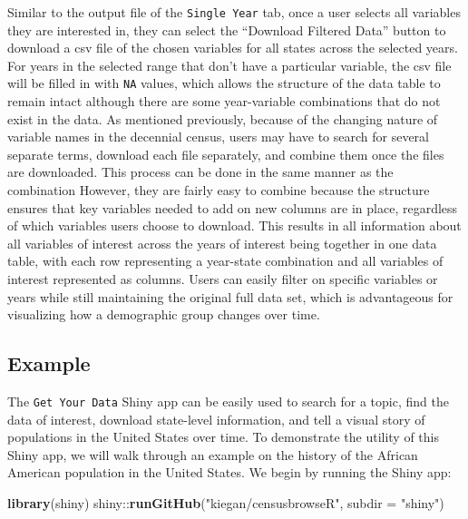 \documentclass[11pt,]{article}
\newenvironment{Shaded}{\begin{snugshade}}{\end{snugshade}}
\newcommand{\KeywordTok}[1]{\textcolor[rgb]{0.13,0.29,0.53}{\textbf{{#1}}}}
\newcommand{\DataTypeTok}[1]{\textcolor[rgb]{0.13,0.29,0.53}{{#1}}}
\newcommand{\StringTok}[1]{\textcolor[rgb]{0.31,0.60,0.02}{{#1}}}
\newcommand{\NormalTok}[1]{{#1}}
\begin{document}
Similar to the output file of the \texttt{Single\ Year} tab, once a user
selects all variables they are interested in, they can select the
``Download Filtered Data'' button to download a csv file of the chosen
variables for all states across the selected years. For years in the
selected range that don't have a particular variable, the csv file will
be filled in with \texttt{NA} values, which allows the structure of the
data table to remain intact although there are some year-variable
combinations that do not exist in the data. As mentioned previously,
because of the changing nature of variable names in the decennial
census, users may have to search for several separate terms, download
each file separately, and combine them once the files are downloaded.
This process can be done in the same manner as the combination However,
they are fairly easy to combine because the structure ensures that key
variables needed to add on new columns are in place, regardless of which
variables users choose to download. This results in all information
about all variables of interest across the years of interest being
together in one data table, with each row representing a year-state
combination and all variables of interest represented as columns. Users
can easily filter on specific variables or years while still maintaining
the original full data set, which is advantageous for visualizing how a
demographic group changes over time.

\subsection{Example}

The \texttt{Get\ Your\ Data} Shiny app can be easily used to search for
a topic, find the data of interest, download state-level information,
and tell a visual story of populations in the United States over time.
To demonstrate the utility of this Shiny app, we will walk through an
example on the history of the African American population in the United
States. We begin by running the Shiny app:

\begin{Shaded}
\begin{Highlighting}[]
\KeywordTok{library}\NormalTok{(shiny)}
\NormalTok{shiny::}\KeywordTok{runGitHub}\NormalTok{(}\StringTok{"kiegan/censusbrowseR"}\NormalTok{, }\DataTypeTok{subdir =} \StringTok{"shiny"}\NormalTok{)}
\end{Highlighting}
\end{Shaded}
\end{document}
